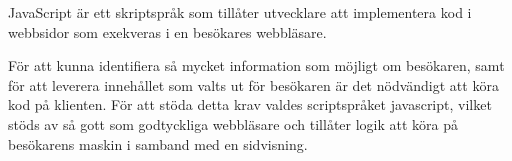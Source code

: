 JavaScript är ett skriptspråk som tillåter utvecklare att implementera kod i webbsidor som exekveras i en besökares webbläsare. 

För att kunna identifiera så mycket information som möjligt om besökaren, samt för att leverera innehållet som valts ut för besökaren är det nödvändigt att köra kod på klienten. För att stöda detta krav valdes scriptspråket javascript, vilket stöds av så gott som godtyckliga webbläsare och tillåter logik att köra på besökarens maskin i samband med en sidvisning.

